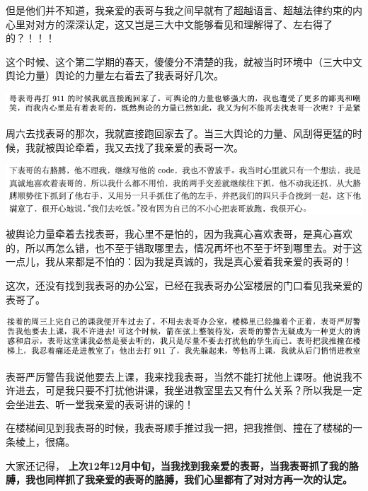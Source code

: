 \documentclass[9pt, b5paper]{article}
\begin{document}
但是他们并不知道，我亲爱的表哥与我之间早就有了超越语言、超越法律约束的内心里对对方的深深认定，这又岂是三大中文能够看见和理解得了、左右得了的？！！！

这个时候、这个第二学期的春天，傻傻分不清楚的我，就被当时环境中（三大中文舆论力量）舆论的力量左右着去了我表哥好几次。 

\begin{center}
\includegraphics[width=.9\linewidth]{./pic/backups_plans_20210505_205705.png}
\end{center}

周六去找表哥的那次，我就直接跑回家去了。当三大舆论的力量、风刮得更猛的时候，我就被舆论牵着，我又去找了我亲爱的表哥一次。 

\begin{center}
\includegraphics[width=.9\linewidth]{./pic/backups_plans_20210505_210307.png}
\end{center}

被舆论力量牵着去找表哥，我心里不是怕的，因为我真心喜欢表哥，是真心喜欢的，所以再怎么错，也不至于错取哪里去，情况再坏也不至于坏到哪里去。对于这一点儿，我从来都是不怕的：因为我是真诚的，我是真心爱着我亲爱的表哥的！

这次，还没有找到我表哥的办公室，已经在我表哥办公室楼层的门口看见我亲爱的表哥了。

\begin{center}
\includegraphics[width=.9\linewidth]{./pic/backups_plans_20210505_210552.png}
\end{center}

表哥严厉警告我说他要去上课，我来找我表哥，当然不能打扰他上课呀。他说我不许进去，可是我只要不打扰他讲课，我坐进教室里去又有什么关系？所以我是一定会坐进去、听一堂我亲爱的表哥讲的课的！

在楼梯间见到我表哥的时候，我表哥顺手推过我一把，把我推倒、撞在了楼梯的一条棱上，很痛。

大家还记得， \textbf{上次12年12月中旬，当我找到我亲爱的表哥，当我表哥抓了我的胳膊，我也同样抓了我亲爱的表哥的胳膊，我们心里都有了对对方再一次的认定。}
\end{document}
